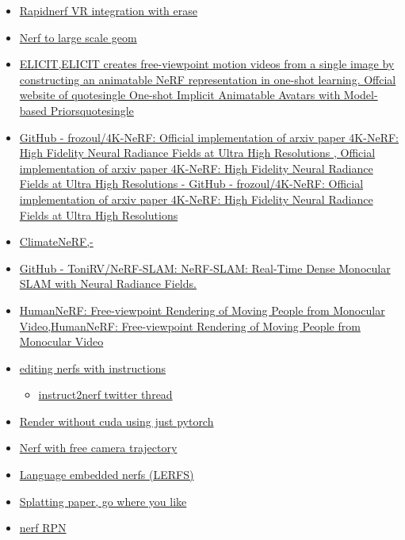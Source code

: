 \begin{itemize}
\begin{itemize}
{    integration}
  \item
    \href{https://github.com/NVlabs/instant-ngp\#vr-controls}{Rapidnerf
    VR integration with erase}
  \item
    \href{https://bakedsdf.github.io/}{Nerf to large scale geom}
  \item
    \href{https://elicit3d.github.io/}{ELICIT,ELICIT creates
    free-viewpoint motion videos from a single image by constructing an
    animatable NeRF representation in one-shot learning. Offcial website
    of quotesingle One-shot Implicit Animatable Avatars with
    Model-based Priorsquotesingle{}}
  \item
    \href{https://github.com/frozoul/4k-nerf}{GitHub - frozoul/4K-NeRF:
    Official implementation of arxiv paper 4K-NeRF: High Fidelity Neural
    Radiance Fields at Ultra High Resolutions , Official implementation
    of arxiv paper 4K-NeRF: High Fidelity Neural Radiance Fields at
    Ultra High Resolutions - GitHub - frozoul/4K-NeRF: Official
    implementation of arxiv paper 4K-NeRF: High Fidelity Neural Radiance
    Fields at Ultra High Resolutions}
  \item
    \href{https://climatenerf.github.io/}{ClimateNeRF,-}
  \item
    \href{https://github.com/tonirv/nerf-slam}{GitHub -
    ToniRV/NeRF-SLAM: NeRF-SLAM: Real-Time Dense Monocular SLAM with
    Neural Radiance Fields.}
  \item
    \href{https://grail.cs.washington.edu/projects/humannerf/}{HumanNeRF:
    Free-viewpoint Rendering of Moving People from Monocular
    Video,HumanNeRF: Free-viewpoint Rendering of Moving People from
    Monocular Video}
  \item
    \href{https://instruct-nerf2nerf.github.io/}{editing nerfs with
    instructions}

    \begin{itemize}
     
    \item
      \href{https://mobile.twitter.com/bilawalsidhu/status/1638919452392583169}{instruct2nerf
      twitter thread}
    \end{itemize}
  \item
    \href{https://github.com/taichi-dev/taichi-nerfs}{Render without
    cuda using just pytorch}
  \item
    \href{https://totoro97.github.io/projects/f2-nerf/}{Nerf with free
    camera trajectory}
  \item
    \href{https://www.lerf.io/}{Language embedded nerfs (LERFS)}
  \item
    \href{https://repo-sam.inria.fr/fungraph/3d-gaussian-splatting/}{Splatting
    paper, go where you like}
  \item
    \href{https://github.com/lyclyc52/NeRF_RPN}{nerf RPN}
  \end{itemize}
\end{itemize}


